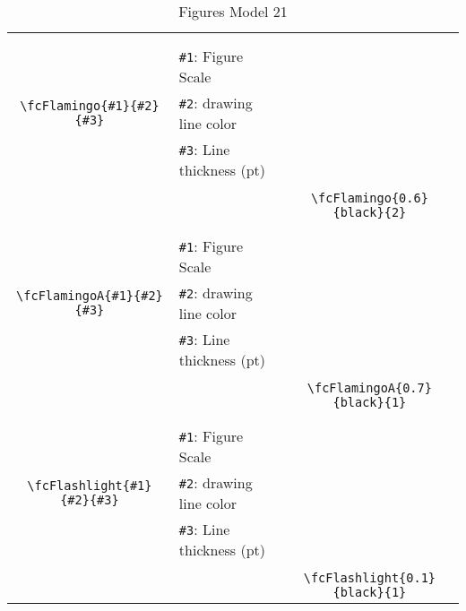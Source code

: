\documentclass[x11names]{article}
\begin{document}
\begin{table}[H]
\begin{tabular}{|c|l|c|}
	&&\multirow{5}{*}{\fcFlamingo{0.6}{black}{2}}\\	&&\\	&\verb|#1|: Figure Scale &\\	\verb|\fcFlamingo{#1}{#2}{#3}|&	\verb|#2|: drawing line color &\\	&\verb|#3|: Line thickness (pt) &\\ &&\\&&	\verb|\fcFlamingo{0.6}{black}{2}|\\\hline 	
	&&\multirow{5}{*}{\fcFlamingoA{0.7}{black}{1}}\\	&&\\	&\verb|#1|: Figure Scale &\\	\verb|\fcFlamingoA{#1}{#2}{#3}|&	\verb|#2|: drawing line color &\\	&\verb|#3|: Line thickness (pt) &\\ &&\\&&	\verb|\fcFlamingoA{0.7}{black}{1}|\\\hline 	
	&&\multirow{5}{*}{\fcFlashlight{0.1}{black}{1}}\\	&&\\	&\verb|#1|: Figure Scale &\\	\verb|\fcFlashlight{#1}{#2}{#3}|&	\verb|#2|: drawing line color &\\	&\verb|#3|: Line thickness (pt) &\\ &&\\&&	\verb|\fcFlashlight{0.1}{black}{1}|\\\hline 	\hline\end{tabular}\caption{Figures Model 21}\label{tab21}\end{table}
\end{document}
